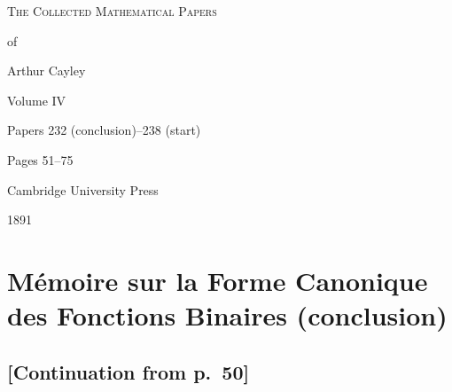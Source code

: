 \documentclass[11pt,a4paper]{article}
\begin{document}
\thispagestyle{empty}
\begin{center}
\vspace*{2cm}
{\Huge\scshape The Collected Mathematical Papers\par\vspace{0.3em} of\par\vspace{0.5em} Arthur Cayley\par\vspace{1.5em}}
{\LARGE Volume IV\par\vspace{1em}}
{\large Papers 232 (conclusion)--238 (start)\par\vspace{0.5em}}
{\large Pages 51--75\par\vspace{2em}}
\vfill
{\large Cambridge University Press\par\vspace{0.3em}}
{\normalsize 1891}
\end{center}
\newpage

\tableofcontents
\newpage

\setcounter{page}{51}


\section*{M\'emoire sur la Forme Canonique des Fonctions Binaires (conclusion)}
\label{paper:232}

\subsection*{[Continuation from p.~50]}
\end{document}
